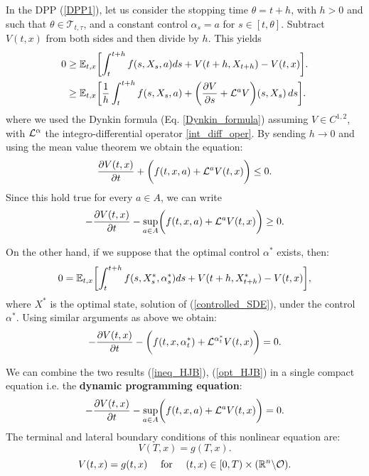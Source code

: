 \noindent
In the DPP (\ref{DPP1}),
let us consider the stopping time $\theta = t + h$, with $h>0$ and such that $\theta \in \mathcal{T}_{t,\tau}$, and a constant control $\alpha_s = a$ for $s \in [t,\theta]$. 
Subtract $V(t,x)$ from both sides and then divide by $h$. This yields
\begin{align*}
   0 \geq& \; \mathbb{E}_{t,x} \biggl[ \int_t^{t+h} f(s,X_s,a) ds + V(t+h, X_{t+h}) - V(t,x) \biggr]. \\ 
     \geq& \; \mathbb{E}_{t,x} \biggl[ \frac{1}{h} \int_t^{t+h} f(s,X_s,a) 
     + \biggl( \frac{\partial V}{\partial s} + \mathcal{L}^{a}V \biggr)(s, X_{s}) \, ds \biggr]. \\
\end{align*}
where we used the Dynkin formula (Eq. \ref{Dynkin_formula}) assuming $V \in C^{1,2}$, with $\mathcal{L}^{\alpha}$ the integro-differential operator \ref{int_diff_oper}.
By sending $h \to 0$ and using the mean value theorem we obtain the equation:
\begin{equation}
 \frac{\partial V(t,x)}{\partial t} + \biggl( f(t,x,a) + \mathcal{L}^{a}V(t,x)  \biggr) \leq 0.
\end{equation}
Since this hold true for every $a \in A$, we can write
\begin{equation}\label{ineq_HJB}
 -\frac{\partial V(t,x)}{\partial t} - \sup_{a \in A} \biggl( f(t,x,a) + \mathcal{L}^{a}V(t,x)  \biggr) \geq 0.
\end{equation}

On the other hand, if we suppose that the optimal control $\alpha^*$ exists, then:
\begin{equation}
 0 = \mathbb{E}_{t,x} \biggl[ \int_t^{t+h} f(s,X^*_s,\alpha^*_s) ds + V(t+h, X^*_{t+h}) - V(t,x) \biggr],
\end{equation}
where $X^*$ is the optimal state, solution of (\ref{controlled_SDE}), under the control $\alpha^*$.
Using similar arguments as above we obtain:
\begin{equation}\label{opt_HJB}
 -\frac{\partial V(t,x)}{\partial t} - \biggl( f(t,x,\alpha_t^*) + \mathcal{L}^{\alpha_t^*} V(t,x)  \biggr) = 0.
\end{equation}

We can combine the two results (\ref{ineq_HJB}), (\ref{opt_HJB}) in a single compact equation i.e. the \textbf{dynamic programming equation}:
\begin{equation}\label{DPE}
 -\frac{\partial V(t,x)}{\partial t} - \sup_{a \in A} \biggl( f(t,x,a) + \mathcal{L}^{a}V(t,x)  \biggr) = 0.
\end{equation}
The terminal and lateral boundary conditions of this nonlinear equation are: 
\begin{equation}\label{DPE_term_cond}
 V(T,x) = g(T,x).
\end{equation}
\begin{equation}\label{DPE_lateral_cond}
 V(t,x) = g(t,x) \quad \mbox{ for } \quad (t,x) \in [0,T)\times (\mathbb{R}^n \backslash \mathcal{O}). 
\end{equation}



